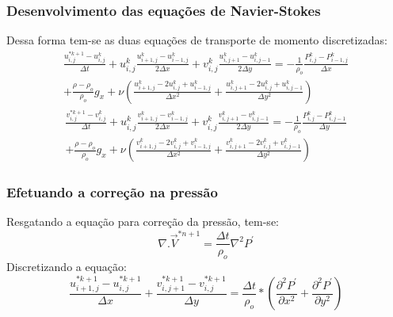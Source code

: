 \documentclass[xcolor=dvipsnames,10pt,aspectratio=169]{beamer}
\begin{document}
	\begin{frame}
		\frametitle{Desenvolvimento das equações de Navier-Stokes}
		Dessa forma tem-se as duas equações de transporte de momento discretizadas:
		\begin{equation}
			\begin{split}
			\frac{u_{i , j}^{\ast k + 1} - u_{i , j}^{k}}{\Delta t} + u_{i , j}^{k}\frac{u_{i + 1 , j}^k - u_{i - 1 , j}^k  }{2 \Delta x} + v_{i , j}^{k}\frac{u_{i , j+ 1}^k - u_{i, j-1}^k  }{2 \Delta y} =  -\frac{1}{\rho_o} \frac{P_{i, j}^k - P_{i - 1 , j}^k}{\Delta x} \\ + \frac{\rho - 	\rho_o}{\rho_o} g_x + \nu \left( \frac{u_{i+1 , j}^k - 2 u_{i,j}^k + u_{i-1,j}^k}{\Delta x^2} + \frac{u_{i , j+1}^k - 2 u_{i,j}^k + u_{i,j-1}^k}{\Delta y^2} \right)
			\end{split}
		\end{equation}
		\begin{equation}
			\begin{split}
			\frac{v_{i , j}^{\ast k + 1} - v_{i , j}^{k}}{\Delta t} + u_{i , j}^{k}\frac{v_{i + 1 , j}^k - v_{i - 1 , j}^k  }{2 \Delta x} + v_{i , j}^{k}\frac{v_{i , j+ 1}^k - v_{i, j-1}^k  }{2 \Delta y} =  -\frac{1}{\rho_o} \frac{P_{i , j}^k - P_{i , j - 1}^k}{\Delta y} \\ + \frac{\rho - 	\rho_o}{\rho_o} g_x + \nu \left( \frac{v_{i+1 , j}^k - 2 v_{i,j}^k + v_{i-1,j}^k}{\Delta x^2} + \frac{v_{i , j+1}^k - 2 v_{i,j}^k + v_{i,j-1}^k}{\Delta y^2} \right)
			\end{split}
		\end{equation}
	\end{frame}




	\begin{frame}
		\frametitle{Efetuando a correção na pressão}
		Resgatando a equação para correção da pressão, tem-se:
		\begin{equation}
			\nabla .\vec{V}^{\ast{n + 1}} = \frac{\Delta t}{\rho_o} \nabla^2 P^\prime
		\end{equation}
		Discretizando a equação:
		\begin{equation}
			\frac{u_{i + 1 , j}^{\ast k + 1} - u_{i , j}^{\ast k + 1}}{\Delta x} + \frac{v_{i , j + 1}^{\ast k + 1} - v_{i , j}^{\ast k + 1}}{\Delta y} = \frac{\Delta t}{\rho_o} * \left( \frac{\partial^2 P^\prime}{\partial x^2} + \frac{\partial^2 P^\prime}{\partial y^2}\right) 
		\end{equation}
		
	\end{frame}
\end{document}
